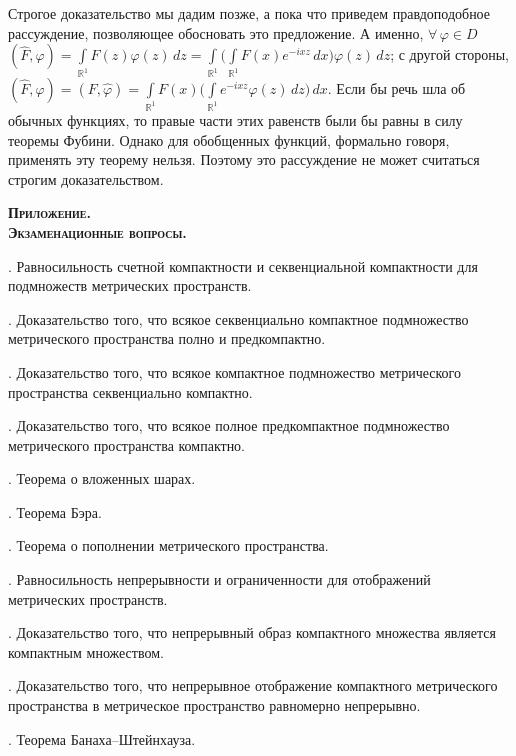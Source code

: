 \documentclass[12pt,titlepage, a4paper]{article}
\begin{document}
Строгое доказательство мы дадим позже, а пока что приведем
правдоподобное рассуждение, позволяющее обосновать это предложение.
А именно, $\forall\,\varphi\in
D$\;\;$(\hat{F},\varphi)=\int\limits_{\mathbb{R}^1}\!\hat{F}(z)\varphi(z)\,dz=
\int\limits_{\mathbb{R}^1}\!\Big(\int\limits_{\mathbb{R}^1}\!F(x)e^{-ixz}\,dx\Big)\varphi(z)\,dz$;
с другой стороны,
$(\hat{F},\varphi)=(F,\hat{\varphi})=\int\limits_{\mathbb{R}^1}\!F(x)\Big(\int\limits_{\mathbb{R}^1}\!
e^{-ixz}\varphi(z)\,dz\Big)\,dx$. Если бы речь шла об обычных
функциях, то правые части этих равенств были бы равны в силу теоремы
Фубини. Однако для обобщенных функций, формально говоря, применять
эту теорему нельзя. Поэтому это рассуждение не может считаться
строгим доказательством.

\clearpage

\begin{center}
\textbf{\textsc{Приложение. \\ Экзаменационные вопросы.}}
\end{center}

\vspace{7pt}

. Равносильность счетной компактности и секвенциальной
компактности для подмножеств метрических пространств.

. Доказательство того, что всякое секвенциально
компактное подмножество  метрического пространства полно и
предкомпактно.

. Доказательство того, что всякое компактное подмножество
метрического пространства секвенциально компактно.

. Доказательство того, что всякое полное предкомпактное
подмножество метрического пространства компактно.

. Теорема о вложенных шарах.

. Теорема Бэра.

. Теорема о пополнении метрического пространства.

. Равносильность непрерывности и ограниченности для
отображений метрических пространств.

. Доказательство того, что непрерывный образ компактного
множества является компактным множеством.

. Доказательство того, что непрерывное отображение
компактного ме\-трического пространства в метрическое пространство
равномерно непрерывно.

. Теорема Банаха--Штейнхауза.
\end{document}
